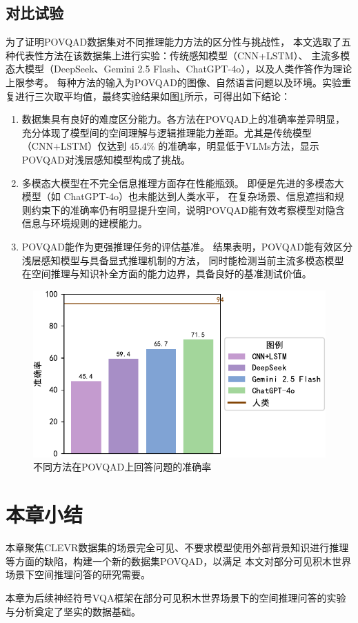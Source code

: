 \subsection{对比试验}
为了证明POVQAD数据集对不同推理能力方法的区分性与挑战性，
本文选取了五种代表性方法在该数据集上进行实验：传统感知模型（CNN+LSTM）、
主流多模态大模型（DeepSeek、Gemini 2.5 Flash、ChatGPT-4o），以及人类作答作为理论上限参考。
每种方法的输入为POVQAD的图像、自然语言问题以及环境。实验重复进行三次取平均值，最终实验结果如图\ref{fig:dataset-comparison}所示，可得出如下结论：
\begin{enumerate}[nosep]
\item 数据集具有良好的难度区分能力。各方法在POVQAD上的准确率差异明显，充分体现了模型间的空间理解与逻辑推理能力差距。尤其是传统模型（CNN+LSTM）仅达到 45.4\% 的准确率，明显低于VLMs方法，显示POVQAD对浅层感知模型构成了挑战。
\item 多模态大模型在不完全信息推理方面存在性能瓶颈。
即便是先进的多模态大模型（如 ChatGPT-4o）也未能达到人类水平，
在复杂场景、信息遮挡和规则约束下的准确率仍有明显提升空间，说明POVQAD能有效考察模型对隐含信息与环境规则的建模能力。
\item POVQAD能作为更强推理任务的评估基准。
结果表明，POVQAD能有效区分浅层感知模型与具备显式推理机制的方法，
同时能检测当前主流多模态模型在空间推理与知识补全方面的能力边界，具备良好的基准测试价值。
\end{enumerate}
\begin{figure}[h]
\centering
\includegraphics[scale=0.8]{figures/dataset-experiment-crop.pdf}
\caption{不同方法在POVQAD上回答问题的准确率}
\label{fig:dataset-comparison}
\end{figure}
\section{本章小结}
本章聚焦CLEVR数据集的场景完全可见、不要求模型使用外部背景知识进行推理等方面的缺陷，构建一个新的数据集POVQAD，以满足
本文对部分可见积木世界场景下空间推理问答的研究需要。

本章为后续神经符号VQA框架在部分可见积木世界场景下的空间推理问答的实验与分析奠定了坚实的数据基础。